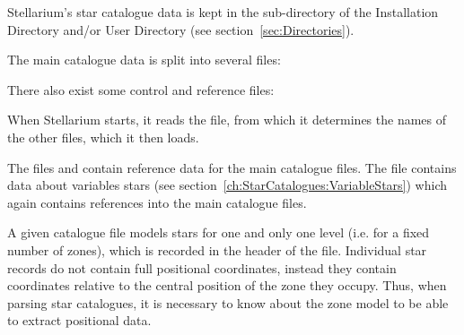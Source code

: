 Stellarium's star catalogue data is kept in the 
sub-directory of the Installation Directory and/or User Directory (see
section~\ref{sec:Directories}).

The main catalogue data is split into several files:

\begin{description}
\item[]
\item[]
\item[]
\item[]
\item[]
\item[]
\item[]
\item[]
\item[]
\end{description}

There also exist some control and reference files:

\begin{description}
\item[]
\item[]
\item[]
\item[]
\item[]
\end{description}

When Stellarium starts, it reads the  file, from which it
determines the names of the other files, which it then loads.

The files  and 
contain reference data for the main catalogue files. The
file  contains data about variables stars
(see section~\ref{ch:StarCatalogues:VariableStars}) which again contains references into 
the main catalogue files.

A given catalogue file models stars for one and only one level (i.e. for
a fixed number of zones), which is recorded in the header of the file.
Individual star records do not contain full positional coordinates,
instead they contain coordinates relative to the central position of the
zone they occupy. Thus, when parsing star catalogues, it is necessary to
know about the zone model to be able to extract positional data.

